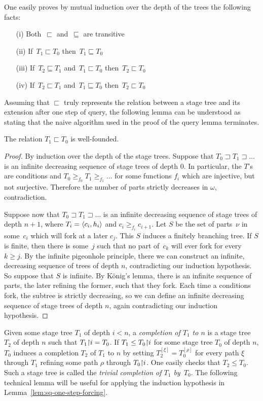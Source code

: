 One easily proves by mutual induction over the depth of the trees the following facts:
\begin{itemize}
	\item[(i)] Both~$\sqsubset$ and~$\sqsubseteq$ are transitive
	\item[(ii)] If~$T_1 \sqsubset T_0$ then~$T_1 \sqsubseteq T_0$
	\item[(iii)] If~$T_2 \sqsubseteq T_1$ and~$T_1 \sqsubset T_0$ then~$T_2 \sqsubset T_0$
	\item[(iv)] If~$T_2 \sqsubset T_1$ and~$T_1 \sqsubseteq T_0$ then~$T_2 \sqsubset T_0$
\end{itemize}
Assuming that $\sqsubset$ truly represents the relation between a stage tree
and its extension after one step of query, the following lemma
can be understood as stating that the naive algorithm used in the proof of the query lemma terminates.

\begin{lemma}\label{lem:sq-well-founded}
The relation $T_1 \sqsubset T_0$ is well-founded.
\end{lemma}
\begin{proof}
By induction over the depth of the stage trees.
Suppose that $T_0 \sqsupset T_1 \sqsupset \dots$ is an infinite
decreasing sequence of stage trees of depth 0.
In particular, the $T$'s are conditions and $T_0 \geq_{f_0} T_1 \geq_{f_1} \dots$
for some functions $f_i$ which are injective, but not surjective. Therefore
the number of parts strictly decreases in $\omega$, contradiction.

Suppose now that $T_0 \sqsupset T_1 \sqsupset \dots$ is an infinite
decreasing sequence of stage trees of depth $n+1$,
where $T_i = \left\langle c_i, h_i \right\rangle$ and $c_i \geq_{f_i} c_{i+1}$.
Let $S$ be the set of parts~$\nu$ in some~$c_i$
which will fork at a later $c_j$. This $S$ induces a finitely branching tree.
If $S$ is finite, then there is some~$j$ such that no part of~$c_k$ will ever fork for every~$k \geq j$.
By the infinite pigeonhole principle, there we can construct an infinite, decreasing sequence
of trees of depth $n$, contradicting our induction hypothesis. So suppose that $S$ is infinite.
By König's lemma, there is an infinite sequence of parts, the later refining the former,
such that they fork. Each time a conditions fork, the subtree is strictly decreasing, so we can
define an infinite decreasing sequence of stage trees of depth $n$, again contradicting our induction hypothesis.
\end{proof}

Given some stage tree $T_1$ of depth $i < n$, a \emph{completion of $T_1$ to $n$}
is a stage tree $T_2$ of depth $n$ such that $T_1 {\upharpoonright} i = T_0$.
If $T_1 \leq T_0 {\upharpoonright} i$ for some stage tree $T_0$ of depth $n$,
$T_0$ induces a completion $T_2$ of $T_1$ to $n$ by setting $T_2^{[\xi]} = T_0^{[\rho]}$
for every path $\xi$ through $T_1$ refining some path $\rho$ through $T_0 {\upharpoonright} i$.
One easily checks that $T_2 \leq T_0$.
Such a stage tree is called the \emph{trivial completion of $T_1$ by~$T_0$}.
The following technical lemma will be useful for applying 
the induction hypothesis in Lemma~\ref{lem:sq-one-step-forcing}.

